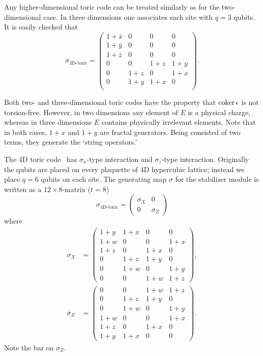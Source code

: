 \begin{example}
\label{eg:highD-toric-codes}
Any higher-dimensional toric code can be treated similarly as for the two-dimensional case.
In three dimensions one associates each site with $q=3$ qubits.
It is easily checked that
\[
 \sigma_\text{3D-toric} = 
\begin{pmatrix}
1 + \bar x & 0   & 0      & 0    \\
1 + \bar y & 0   & 0      & 0    \\
1 + \bar z & 0   & 0      & 0    \\
\hline
0          & 0   & 1+z    & 1+y  \\
0          & 1+z & 0      & 1+x  \\
0          & 1+y & 1+x    & 0    \\
\end{pmatrix} .
\]

Both two- and three-dimensional toric codes have the property 
that $\mathop{\mathrm{coker}}\nolimits \epsilon$ is not torsion-free.
However, in two dimensions any element of $E$ is a physical charge,
whereas in three dimensions $E$ contains physically irrelevant elements.
Note that in both cases, $1+x$ and $1+y$ are fractal generators.
Being consisted of two terms, they generate the `string operators.'


The 4D toric code~\cite{DennisKitaevLandahlEtAl2002Topological}
has $\sigma_x$-type interaction and $\sigma_z$-type interaction.
Originally the qubits are placed on every plaquette of 4D hypercubic lattice;
instead we place $q=6$ qubits on each site.
The generating map $\sigma$ for the stabilizer module is written as
a $12 \times 8$-matrix ($t=8$)
\[
\sigma_\text{4D-toric} =
\begin{pmatrix}
 \sigma_X & 0 \\
 0        & \sigma_Z
\end{pmatrix}
\]
where
\begin{align*}
 \sigma_X &= 
\begin{pmatrix}
1+y & 1+x & 0   & 0   \\
1+w & 0   & 0   & 1+x \\
1+z & 0   & 1+x & 0   \\
0   & 1+z & 1+y & 0   \\
0   & 1+w & 0   & 1+y \\
0   & 0   & 1+w & 1+z
\end{pmatrix}, \\
\bar \sigma_Z &=
\begin{pmatrix}
0   & 0   & 1+w & 1+z \\
0   & 1+z & 1+y & 0   \\
0   & 1+w & 0   & 1+y \\
1+w & 0   & 0   & 1+x \\
1+z & 0   & 1+x & 0   \\
1+y & 1+x & 0   & 0
\end{pmatrix}.
\end{align*}
Note the bar on $\sigma_Z$.


\end{example}
